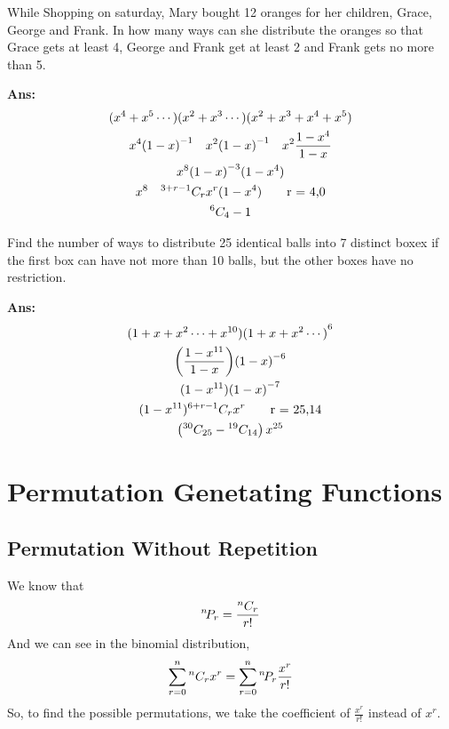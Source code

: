 \begin{example}
    While Shopping on saturday, Mary bought 12 oranges for her children, Grace, George and Frank. In how many ways can she distribute the oranges so that Grace gets at least 4, George and Frank get at least 2 and Frank gets no more than 5.

    \textbf{Ans:}
    \begin{gather*}
        {(x^4 + x^5 \cdots)}{(x^2 + x^3 \cdots )}{(x^2 + x^3 + x^4 + x^5)} \\
        x^4 {(1 - x)}^{-1} \quad x^2 {(1 - x)}^{-1} \quad x^2 \frac{1 - x^4}{1 - x}\\
        x^8 {(1 - x)}^{-3} (1 - x^4) \\
        x^8 \quad {}^{3 + r - 1}C_{r} x^r (1 - x^4) \tag*{r = 4,0}\\
        {}^{6}C_{4} - 1
    \end{gather*}
\end{example}

\begin{example}
    Find the number of ways to distribute 25 identical balls into 7 distinct boxex if the first box can have not more than 10 balls, but the other boxes have no restriction.

    \textbf{Ans:}
    \begin{gather*}
        {(1 + x + x^2\cdots + x^{10})} {(1 + x + x^2\cdots )}^6\\
        {\left(\frac{1 - x^{11}}{1 - x}\right)} {(1 - x)}^{-6} \\
        {(1 - x^{11})} {(1 - x)}^{-7} \\
        {(1 - x^{11})} {}^{6 + r - 1}C_{r} x^r \tag*{r = 25,14} \\
        \left({}^{30}C_{25} - {}^{19}C_{14} \right) x^{25}
    \end{gather*}
\end{example}

\section{Permutation Genetating Functions}
\subsection{Permutation Without Repetition}

We know that
\begin{equation*}
    {}^{n}\!P_{r} = \frac{{}^{n}C_{r}}{r!}
\end{equation*}
And we can see in the binomial distribution,
\begin{equation*}
    \sum_{r = 0}^{n} {}^{n}C_{r} x^r = \sum_{r = 0}^{n} {}^{n}\!P_{r} \frac{x^r}{r!}
\end{equation*}
So, to find the possible permutations, we take the coefficient of \mbox{\(\frac{x^r}{r!}\)} instead of \mbox{\(x^r\)}.

